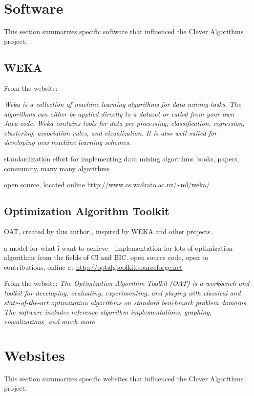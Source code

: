 \documentclass[a4paper, 11pt]{article}
\begin{document}
\section{Software}
\label{sec:software}
This section summarizes specific software that influenced the Clever Algorithms project.

\subsection{WEKA}
From the website: 

\emph{Weka is a collection of machine learning algorithms for data mining tasks. The algorithms can either be applied directly to a dataset or called from your own Java code. Weka contains tools for data pre-processing, classification, regression, clustering, association rules, and visualization. It is also well-suited for developing new machine learning schemes.}



standardization effort for implementing data mining algorithms \cite{Hall2009}
books, papers, community, many many algorithms

open source, located online \url{http://www.cs.waikato.ac.nz/~ml/weka/}

\subsection{Optimization Algorithm Toolkit}
OAT, created by this author \cite{Brownlee2007}, inspired by WEKA and other projects.

a model for what i want to achieve - implementation for lots of optimization algorithms from the fields of CI and BIC. open source code, open to contributions, online at \url{http://optalgtoolkit.sourceforge.net}

From the website: 
\emph{The Optimization Algorithm Toolkit (OAT) is a workbench and toolkit for developing, evaluating, experimenting, and playing with classical and state-of-the-art optimization algorithms on standard benchmark problem domains. The software includes reference algorithm implementations, graphing, visualizations, and much more.}


\section{Websites}
\label{sec:websites}
This section summarizes specific websites that influenced the Clever Algorithms project.
\end{document}
